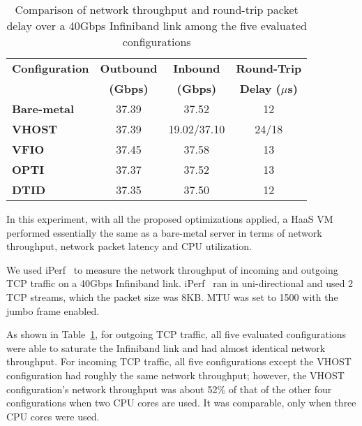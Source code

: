 
\begin{table}
\renewcommand{\arraystretch}{1.2}
\small
\begin{center}
\begin{tabular}{|l|c|c|c|} \hline
{\bf Configuration} & {\bf Outbound} & {\bf Inbound} & {\bf Round-Trip} \\
                    & {\bf (Gbps)}   & {\bf (Gbps)}  & {\bf Delay ($\mu$s)} \\ \hline
{\bf Bare-metal} & 37.39 & 37.52 & 12 \\ \hline
{\bf VHOST}      & 37.39 & 19.02/37.10 & 24/18\\ \hline
{\bf VFIO}       & 37.45 & 37.58 & 13 \\ \hline
{\bf OPTI}       & 37.37 & 37.52 & 13 \\ \hline
{\bf DTID}       & 37.35 & 37.50 & 12 \\ \hline
\end{tabular}
\end{center}
\vspace{-0.1in}
\caption{Comparison of network throughput and round-trip
packet delay over a 40Gbps Infiniband link among the five
evaluated configurations}
\label{tab:network_performance}
\vspace{-0.1in}
\end{table}

In this experiment, with all the proposed optimizations
applied, a HaaS VM performed essentially the same as a
bare-metal server in terms of network throughput, network
packet latency and CPU utilization.

We used iPerf~\cite{iperf} to measure the network throughput
of incoming and outgoing TCP traffic on a 40Gbps Infiniband
link. iPerf~\cite{iperf} ran in uni-directional and used 2 TCP
streams, which the packet size was 8KB. MTU was set to 1500
with the jumbo frame enabled.

As shown in Table~\ref{tab:network_performance}, for outgoing
TCP traffic, all five evaluated configurations were able to
saturate the Infiniband link and had almost identical network
throughput. For incoming TCP traffic, all five configurations
except the VHOST configuration had roughly the same network
throughput; however, the VHOST configuration's network
throughput was about 52\% of that of the other four
configurations when two CPU cores are used. It was comparable,
only when three CPU cores were used.

